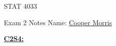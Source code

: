 \documentclass[letter, 12pt]{article}
\begin{document}
\begin{center}
STAT 4033
\end{center}
Exam 2 Notes \hfill Name: \uline{Cooper Morris}
\begin{multicols}{2}
\textbf{\uline{C2S4:}}\\


\end{multicols}
\newpage
\begin{multicols}{2}

\end{multicols}
\end{document}
